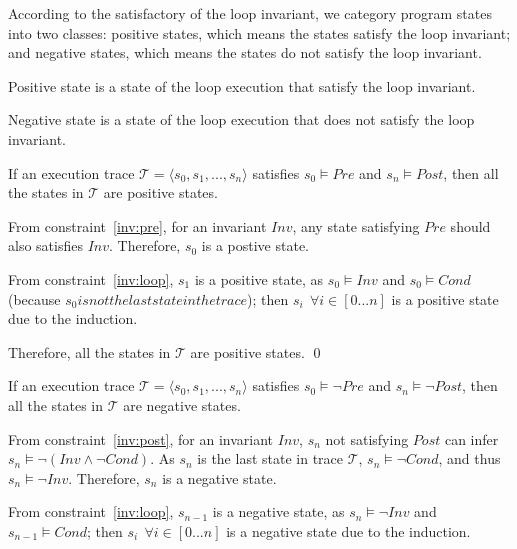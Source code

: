 According to the satisfactory of the loop invariant,
we category program states into two classes:
positive states, which means the states satisfy the loop invariant;
and negative states, which means the states do not satisfy the loop invariant.
\begin{definition}
Positive state is a state of the loop execution that satisfy the loop invariant.
\end{definition}
\begin{definition}
Negative state is a state of the loop execution that does not satisfy the loop invariant.
\end{definition}

\begin{theorem}
If an execution trace $\mathcal{T} = \langle s_0, s_1, ..., s_n\rangle$ satisfies $s_0 \models Pre$ and $s_n \models Post$,
then all the states in $\mathcal{T}$ are positive states.
\end{theorem}

From constraint~\ref{inv:pre}, for an invariant $Inv$, 
any state satisfying $Pre$ should also satisfies $Inv$.
Therefore, $s_0$ is a postive state.

From constraint~\ref{inv:loop}, $s_1$ is a positive state, as $s_0 \models Inv$ 
and  $s_0 \models Cond$ (because $s_0 is not the last state in the trace$);
then $s_i~~\forall i \in [0...n]$ is a positive state due to the induction.

Therefore, all the states in $\mathcal{T}$ are positive states. \hfill \qed



\begin{theorem}
If an execution trace $\mathcal{T} = \langle s_0, s_1, ..., s_n\rangle$ satisfies $s_0 \models \neg Pre$ and $s_n \models \neg Post$,
then all the states in $\mathcal{T}$ are negative states.
\end{theorem}
From constraint~\ref{inv:post}, for an invariant $Inv$, 
$s_n$ not satisfying $Post$ can infer $s_n \models \neg(Inv \wedge \neg Cond)$.
As $s_n$ is the last state in trace $\mathcal{T}$, $s_n \models \neg Cond$, and thus $s_n \models \neg Inv$.
Therefore, $s_n$ is a negative state.

From constraint~\ref{inv:loop}, $s_{n-1}$ is a negative state, as $s_n \models \neg Inv$ and $s_{n-1} \models Cond$;
then $s_i~~\forall i \in [0...n]$ is a negative state due to the induction.

